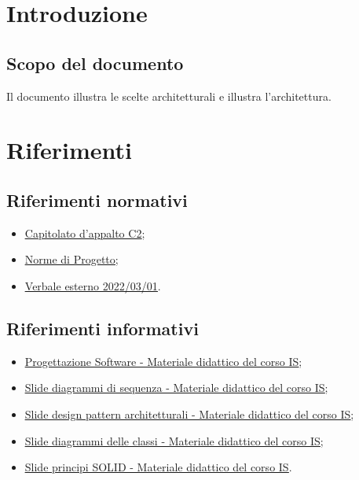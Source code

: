 \documentclass[a4paper, 12pt]{article}
\begin{document}
\makefrontpage

\makeversioni

\tableofcontents
\clearpage

\section{Introduzione}
\subsection{Scopo del documento}
Il documento illustra le scelte architetturali e illustra l'architettura.

\section{Riferimenti}
\subsection{Riferimenti normativi}
\begin{itemize}
    \item \underline{\href{https://www.math.unipd.it/~tullio/IS-1/2021/Progetto/C2.pdf}{Capitolato d'appalto C2}};
    \item \underline{\href{https://github.com/iota97/WinningSoftwareSolution/blob/main/public/interni/norme_di_progetto_v2.0.0.pdf}{Norme di Progetto}};
    \item \underline{\href{https://github.com/iota97/WinningSoftwareSolution/blob/main/public/esterni/verbali/2022_01_03_E.pdf}{Verbale esterno 2022/03/01}}.
\end{itemize}
\subsection{Riferimenti informativi}
\begin{itemize}
    \item \underline{\href{https://www.math.unipd.it/~tullio/IS-1/2021/Dispense/T09.pdf}{Progettazione Software - Materiale didattico del corso IS}};
    \item \underline{\href{https://www.math.unipd.it/~rcardin/swea/2022/Diagrammi\%20di\%20Sequenza.pdf}{Slide diagrammi di sequenza - Materiale didattico del corso IS}};
    \item \underline{\href{https://www.math.unipd.it/~rcardin/swea/2022/Software\%20Architecture\%20Patterns.pdf}{Slide design pattern architetturali - Materiale didattico del corso IS}};
    \item \underline{\href{https://www.math.unipd.it/~rcardin/swea/2021/Diagrammi\%20delle\%20Classi_4x4.pdf}{Slide diagrammi delle classi - Materiale didattico del corso IS}};
    \item \underline{\href{https://www.math.unipd.it/~rcardin/sweb/2022/L03.pdf}{Slide principi SOLID - Materiale didattico del corso IS}}.
\end{itemize}
\end{document}
